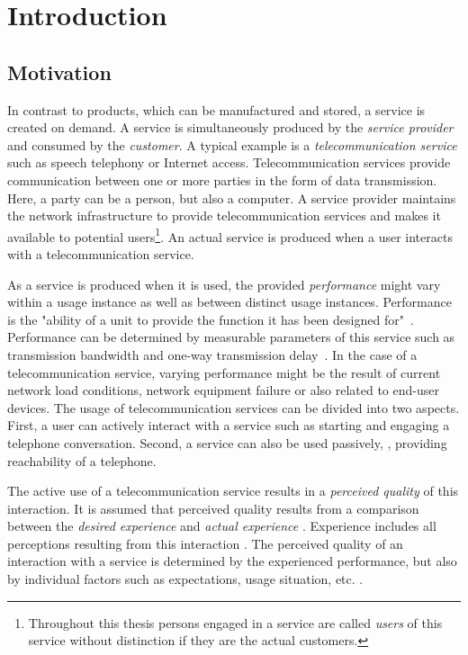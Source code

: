 \chapter{Introduction}\label{chap:01}

\section{Motivation}
In contrast to products, which can be manufactured and stored, a service is created on demand.
A service is simultaneously produced by the \emph{service provider} and consumed by the \emph{customer}.
A typical example is a \emph{telecommunication service} such as speech telephony or Internet access.
Telecommunication services provide communication between one or more parties in the form of data transmission.
Here, a party can be a person, but also a computer.
A service provider maintains the network infrastructure to provide telecommunication services and makes it available to potential users\footnote{Throughout this thesis persons engaged in a service are called \emph{users} of this service without distinction if they are the actual customers.}.
An actual service is produced when a user interacts with a telecommunication service.

As a service is produced when it is used, the provided \emph{performance} might vary within a usage instance as well as between distinct usage instances.
Performance is the "ability of a unit to provide the function it has been designed for"~\citep[][p.~360]{moller_quality_2005}.
Performance can be determined by measurable parameters of this service such as transmission bandwidth and one-way transmission delay~\citep[][p.~12]{moller_assessment_2000}.
In the case of a telecommunication service, varying performance might be the result of current network load conditions, network equipment failure or also related to end-user devices.
The usage of telecommunication services can be divided into two aspects.
First, a user can actively interact with a service such as starting and engaging a telephone conversation.
Second, a service can also be used passively, \eg, providing reachability of a telephone.

The active use of a telecommunication service results in a \emph{perceived quality} of this interaction.
It is assumed that perceived quality results from a comparison between the \emph{desired experience} and \emph{actual experience} \citep[][p.~13]{raake_quality_2014}. %
Experience includes all perceptions resulting from this interaction \citep[][p.~13]{raake_quality_2014}.
The perceived quality of an interaction with a service is determined by the experienced performance, but also by individual factors such as expectations, usage situation, etc. \citep[\eg,][p.~55ff.]{reiter_factors_2014}.

